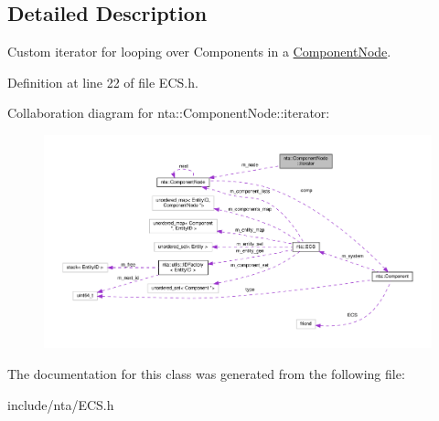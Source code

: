 \subsection{Detailed Description}
Custom iterator for looping over Components in a \hyperlink{structnta_1_1ComponentNode}{Component\+Node}. 

Definition at line 22 of file E\+C\+S.\+h.



Collaboration diagram for nta\+:\+:Component\+Node\+:\+:iterator\+:
\nopagebreak
\begin{figure}[H]
\begin{center}
\leavevmode
\includegraphics[width=350pt]{de/db4/classnta_1_1ComponentNode_1_1iterator__coll__graph}
\end{center}
\end{figure}


The documentation for this class was generated from the following file\+:\begin{DoxyCompactItemize}
\item 
include/nta/E\+C\+S.\+h\end{DoxyCompactItemize}
